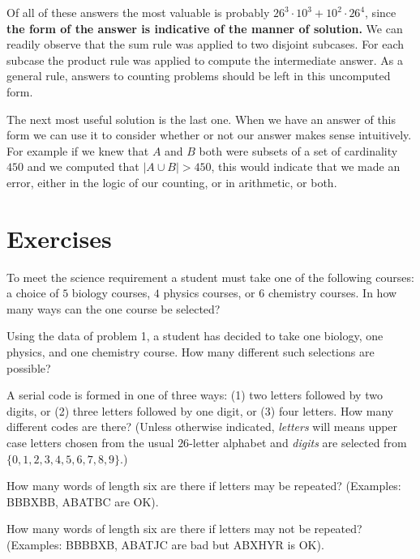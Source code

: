 Of all of these answers the most valuable is probably 
$26^3\cdot 10^3 + 10^2\cdot 26^4$, since {\bfseries the form
of the answer is indicative of the manner of solution.} 
We can readily observe
that the sum rule was applied to two disjoint subcases. For each subcase
the product rule was applied to compute the intermediate answer. As a general
rule, answers to counting problems should be left in this uncomputed form.

The next most useful solution is the last one. When we have an answer of this
form we can use it to consider whether or not our answer makes sense intuitively.
For example if we knew that $A$ and $B$ both were subsets of a set of cardinality 
$450$ and we computed that $\lvert A\cup B \rvert>450$, this would indicate that we made
an error, either in the logic of our counting, or in arithmetic, or both.

\clearpage
\section{Exercises}

\begin{exer}
To meet the science requirement a student must take
 one of the following courses: a choice of $5$ biology courses, $4$
physics courses, or $6$ chemistry courses. In how many ways can the
one course be selected?
\end{exer}

\begin{exer}
Using the data of problem 1, a student has decided to take one biology,
one physics, and one chemistry course. How many different such selections
are possible?
\end{exer}

\begin{exer}
A serial code is formed in one of three ways: (1) two letters followed by two digits, or
(2) three letters followed by one digit, or (3) four letters. How many different codes are there?
 (Unless otherwise
indicated, {\itshape letters} will means
 upper case letters chosen from the usual
$26$-letter alphabet and {\itshape digits} are selected from 
$\{0,1,2,3,4,5,6,7,8,9\}$.) 
\end{exer}

\begin{exer}
How many words of length
six are there if letters may be repeated? (Examples: BBBXBB, ABATBC are OK).
\end{exer}

\begin{exer}
How many words of length
six are there if letters may not be repeated? (Examples: BBBBXB, ABATJC are bad
but ABXHYR is OK).
\end{exer}

